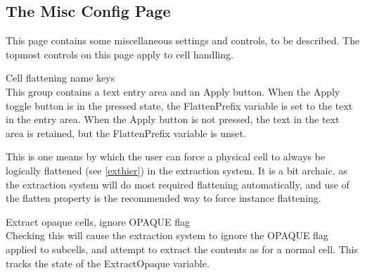 \subsection{The {\cb Misc Config} Page}

This page contains some miscellaneous settings and controls, to be
described.  The topmost controls on this page apply to cell handling.

\begin{description}
\item{\cb Cell flattening name keys}\\
This group contains a text entry area and an {\cb Apply} button.  When
the {\cb Apply} toggle button is in the pressed state, the {\et
FlattenPrefix} variable is set to the text in the entry area.  When
the {\cb Apply} button is not pressed, the text in the text area is
retained, but the {\et FlattenPrefix} variable is unset.

This is one means by which the user can force a physical cell to
always be logically flattened (see \ref{exthier}) in the extraction
system.  It is a bit archaic, as the extraction system will do most
required flattening automatically, and use of the {\et flatten}
property is the recommended way to force instance flattening.

\item{\cb Extract opaque cells, ignore OPAQUE flag}\\
Checking this will cause the extraction system to ignore the OPAQUE
flag applied to subcells, and attempt to extract the contents as for a
normal cell.  This tracks the state of the {\et ExtractOpaque}
variable.
\end{description}


